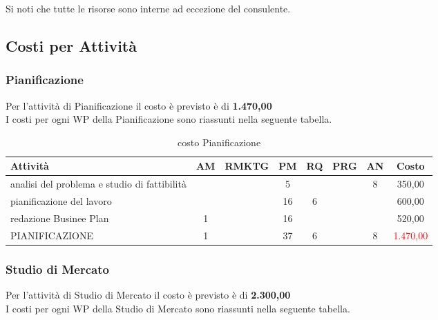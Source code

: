 Si noti che tutte le risorse sono interne ad eccezione del consulente. 











\subsection{Costi per Attività}

	

\subsubsection{Pianificazione}
Per l'attività di Pianificazione il costo è previsto è di \textbf{ \text{\euro}1.470,00 }\\	
I costi per ogni WP della Pianificazione sono riassunti nella seguente tabella.
\begin{table}[!h]
\centering
\begin{tabular}{|l|c|c|c|c|c|c|c|}
\hline
\textbf{Attività}& \textbf{AM} & \textbf{RMKTG} & \textbf{PM} & \textbf{RQ} & \textbf{PRG} & \textbf{AN} & \textbf{Costo}  \\ 
              
\hline
analisi del problema e studio di fattibilità  & & & 5& & & 8& \text{\euro} 350,00\\
pianificazione del lavoro	 				  & & &	16&	6& & & \text{\euro} 600,00 \\	
redazione Businee Plan						& 1 & &16& & & &  	\text{\euro} 520,00 \\			  
\hline
PIANIFICAZIONE   							& 1 & &37 &	6 &	&	8 &	\textcolor{red}{ \text{\euro}1.470,00 }\\		 
\hline
\end{tabular}
\caption{costo Pianificazione}\label{tab:pianificazione}
\end{table}
 


\subsubsection{Studio di Mercato}

Per l'attività di Studio di Mercato il costo è previsto è di \textbf{ \text{\euro}2.300,00 }\\	
I costi per ogni WP della Studio di Mercato sono riassunti nella seguente tabella.


